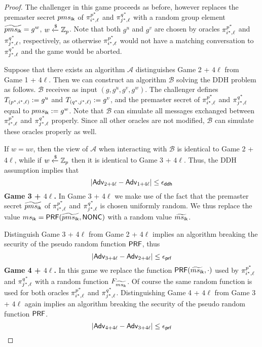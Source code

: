 \begin{proof}
 The challenger in this game proceeds as before, however replaces the premaster secret $pms_{\mathsf{ik}}$ of $\pi^{p^{\ast}}_{i^{\ast},\ell}$ and $\pi^{q^{\ast}}_{j^{\ast},\ell}$ with a random group element $\widetilde{pms_{\mathsf{ik}}} = g^w$, $w \xleftarrow{\$} \mathbb{Z}_p$. Note that both $g^u$ and $g^v$ are chosen by oracles $\pi^{p^{\ast}}_{i^{\ast},\ell}$ and $\pi^{q^{\ast}}_{j^{\ast},\ell}$, respectively, as otherwise $\pi^{p^{\ast}}_{i^{\ast},\ell}$ would not have a matching conversation to $\pi^{q^{\ast}}_{j^{\ast},\ell}$ and the game would be aborted.

 Suppose that there exists an algorithm $\mathcal{A}$ distinguishes Game 2 + $4\ell$ from Game 1 + $4\ell$. Then we can construct an algorithm $\mathcal{B}$ solving the DDH problem as follows. $\mathcal{B}$ receives as input $(g,g^u,g^v,g^w)$. The challenger defines $T_{(p^{\ast}, i^{\ast}, \ell)} := g^u$ and $T_{(q^{\ast}, j^{\ast}, \ell)} := g^v$, and the premaster secret of $\pi^{p^{\ast}}_{i^{\ast},\ell}$ and $\pi^{q^{\ast}}_{j^{\ast},\ell}$ equal to $pms_{\mathsf{ik}} := g^w$. Note that $\mathcal{B}$ can simulate all messages exchanged between $\pi^{p^{\ast}}_{i^{\ast},\ell}$ and $\pi^{q^{\ast}}_{j^{\ast},\ell}$ properly. Since all other oracles are not modified, $\mathcal{B}$ can simulate these oracles properly as well.

 If $w=uv$, then the view of $\mathcal{A}$ when interacting with $\mathcal{B}$ is identical to Game 2 + $4\ell$, while if $w \xleftarrow{\$}\mathbb{Z}_p$ then it is identical to Game 3 + $4\ell$. Thus, the DDH assumption implies that
 \begin{equation}
  |\mathsf{Adv}_{2 + 4\ell} - \mathsf{Adv}_{1 + 4\ell}| \leq \epsilon_{\mathsf{ddh}}
 \end{equation}%
%
%
 \textbf{Game 3 + $4\ell$.} In Game 3 + 4$\ell$ we make use of the fact that the premaster secret $\widetilde{pms_{\mathsf{ik}}}$ of $\pi^{p^{\ast}}_{i^{\ast},\ell}$ and $\pi^{q^{\ast}}_{j^{\ast},\ell}$ is chosen uniformly random. We thus replace the value $ms_{\mathsf{ik}} = \mathsf{PRF}(\widetilde{pms_{\mathsf{ik}}}, \mathsf{NONC})$ with a random value $\widetilde{ms_{\mathsf{ik}}}$.

 Distinguish Game 3 + 4$\ell$ from Game 2 + 4$\ell$ implies an algorithm breaking the security of the pseudo random function $\mathsf{PRF}$, thus
 \begin{equation}
  |\mathsf{Adv}_{3 + 4\ell} - \mathsf{Adv}_{2 + 4\ell}| \leq \epsilon_{\mathsf{prf}}
 \end{equation}%
%
%
 \textbf{Game 4 + $4\ell$.} In this game we replace the function $\mathsf{PRF}(\widetilde{ms_{\mathsf{ik}}}, \cdot)$ used by $\pi^{p^{\ast}}_{i^{\ast},\ell}$ and $\pi^{q^{\ast}}_{j^{\ast},\ell}$ with a random function $F_{\widetilde{ms_{\mathsf{ik}}}}$. Of course the same random function is used for both oracles $\pi^{p^{\ast}}_{i^{\ast},\ell}$ and $\pi^{q^{\ast}}_{j^{\ast},\ell}$. Distinguishing Game 4 + $4\ell$ from Game 3 + $4\ell$ again implies an algorithm breaking the security of the pseudo random function $\mathsf{PRF}$.
 \begin{equation}
  |\mathsf{Adv}_{4 + 4\ell} - \mathsf{Adv}_{3 + 4\ell}| \leq \epsilon_{\mathsf{prf}}
 \end{equation}%


\end{proof}
